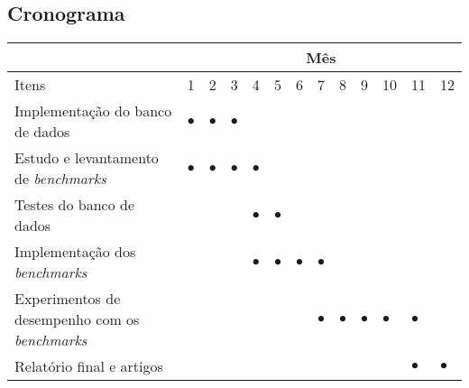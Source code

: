 \documentclass[a4paper,12pt]{article}
\newcommand{\benchmarks}{\emph{benchmarks}}
\begin{document}
\subsection{Cronograma}

\begin{center}
\begin{footnotesize}
\begin{tabular}{||l||p{0.2cm}|p{0.2cm}|p{0.2cm}|p{0.2cm}|p{0.2cm}|p{0.2cm}|p{0.2cm}|p{0.2cm}|p{0.2cm}|p{0.2cm}|p{0.2cm}|p{0.24cm}||}
  \hline
  \hline
                        & \multicolumn{12}{|c||}{M\^es}\\
  \hline
  \hline
  Itens &1 &2 &3 &4 &5 &6 &7 &8 &9 &10&11&12\\
  \hline

  Implementação do banco de dados &$\bullet$&$\bullet$&$\bullet$&         &         &         &         &         &         &         &          &         \\
  \hline

  Estudo e levantamento de \benchmarks           &$\bullet$&$\bullet$&$\bullet$&$\bullet$&         &         &         &         &         &         &          &         \\
  \hline

  Testes do banco de dados        &         &         &         &$\bullet$&$\bullet$&         &         &         &         &         &          &         \\
  \hline

  Implementação dos \benchmarks   &         &         &         &$\bullet$&$\bullet$&$\bullet$&$\bullet$&         &         &         &          &         \\
  \hline

  Experimentos de desempenho com os \benchmarks          &         &         &         &         &         &         &$\bullet$&$\bullet$&$\bullet$& $\bullet$&$\bullet$&   \\
  \hline
  
  Relatório final e artigos                      &         &         &         &         &         &         &         &         &         &         &$\bullet$&$\bullet$\\
  \hline

  \hline
\end{tabular}
\label{tab:cronograma}  
\end{footnotesize}
\end{center}

\begin{small}

\end{small}
\end{document}
